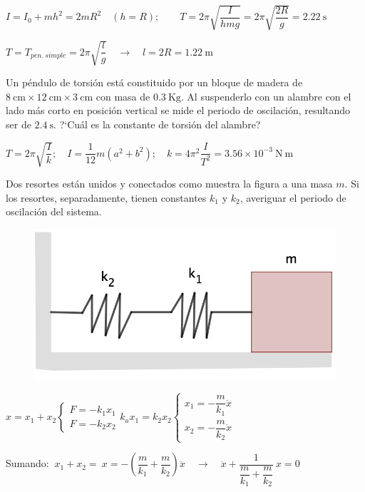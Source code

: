 $I=I_0+mh^2=2mR^2\quad (h=R); \qquad  T=2\pi \sqrt{\dfrac{I}{hmg}}=2\pi \sqrt{\dfrac{2R}{g}}=2.22\ \mathrm{s}$

$T=T_{pen.\ simple}=2\pi \sqrt{\dfrac l g} \quad \to \quad l=2R=1.22\ \mathrm{m}$
\vspace{5mm}%
\begin{prob}
Un péndulo de torsión está constituido por un bloque de madera de $8\ \mathrm{cm}	\times 12 \ \mathrm{cm}	\times 3 \ \mathrm{cm}$ con masa de $0.3\ \mathrm{Kg}$. Al suspenderlo con un alambre con el lado más corto en posición vertical se mide el periodo de oscilación, resultando ser de $2.4\ \mathrm{s}$. ?`Cuál es la constante de torsión del alambre?
\end{prob}

$T=2\pi \sqrt{\dfrac I k};\quad I=\dfrac 1 {12} m (a^2+b^2); \quad k=4\pi^2 \dfrac {I}{T^2}=3.56\times 10^{-3} \ \mathrm{N \ m}$

\vspace{5mm}%
\begin{prob}
\begin{multicols}{2}
Dos resortes están unidos y conectados como muestra la figura a una masa $m$. Si los resortes, separadamente, tienen constantes $k_1$ y $k_2$, averiguar el periodo de oscilación del sistema.
\begin{figure}[H]
		\centering
		\includegraphics[width=.5\textwidth]{imagenes/imagenes21/T21IM10.png}
	\end{figure}	
\end{multicols}	
\end{prob}

$x=x_1+x_2 \begin{cases}
 F=-k_1x_1 \\
 F=-k_2x_2	
 \end{cases}
 k_ax_1=k_2x_2 \begin{cases}
 x_1=-\dfrac{m}{k_1}\ddot{x} \\  x_2=-\dfrac{m}{k_2}\ddot{x}	
 \end{cases}$

Sumando: $\ x_1+x_2 =\ x=-\left( \dfrac {m}{k_1} + \dfrac{m}{k_2} \right) \ddot{x} \quad \to \quad \ddot{x}+\dfrac {1}{\dfrac {m}{k_1} + \dfrac{m}{k_2}} \ x = 0$

